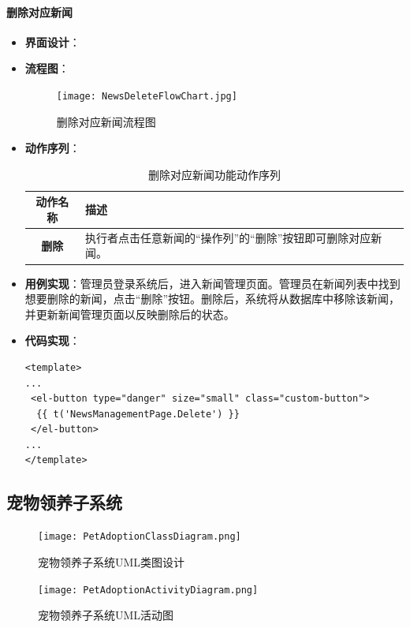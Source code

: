 \paragraph{删除对应新闻}
\begin{itemize}
	\item \textbf{界面设计}：
	\item \textbf{流程图}：
	\begin{figure}[H]
		\centering
		\texttt{[image: NewsDeleteFlowChart.jpg]}
		\caption{删除对应新闻流程图}
		\label{NewsDeleteFlowChart}
	\end{figure}
	\item \textbf{动作序列}：
	\begin{table}[H]
		\centering
		\caption{删除对应新闻功能动作序列}
		\renewcommand\arraystretch{1.5}
		\begin{tabular}{|c|>{\raggedright\arraybackslash}p{10cm}|}
			\hline
			\textbf{动作名称} & \textbf{描述} \\ \hline
			\textbf{删除} & 执行者点击任意新闻的“操作列”的“删除”按钮即可删除对应新闻。 \\ \hline
		\end{tabular}
	\end{table}
	\item \textbf{用例实现}：管理员登录系统后，进入新闻管理页面。管理员在新闻列表中找到想要删除的新闻，点击“删除”按钮。删除后，系统将从数据库中移除该新闻，并更新新闻管理页面以反映删除后的状态。
	\item \textbf{代码实现}：
	\begin{verbatim}
<template>
...
 <el-button type="danger" size="small" class="custom-button">
  {{ t('NewsManagementPage.Delete') }}
 </el-button>
...
</template>
	\end{verbatim}
\end{itemize}

\subsection{宠物领养子系统}

\begin{figure}[H]
	\centering
	\texttt{[image: PetAdoptionClassDiagram.png]}
	\caption{宠物领养子系统UML类图设计}
\end{figure}

\begin{figure}[H]
	\centering
	\texttt{[image: PetAdoptionActivityDiagram.png]} 
	\caption{宠物领养子系统UML活动图}
	\label{fig:PetAdoptionActivityDiagram}
\end{figure}

